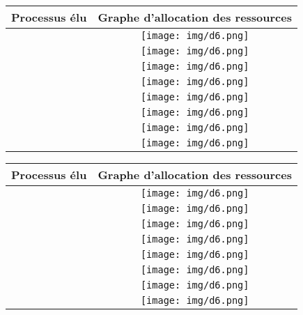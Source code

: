 \documentclass[a4paper,12pt,french]{book}
\newcommand{\truc}{4.5cm}
\begin{document}
\LARGE
\begin{center}
\begin{tabular}{|c|c|}
\hline
\rowcolor{UGLiOrange}\textbf{\color{white}Processus élu} & \textbf{\color{white}Graphe d'allocation des ressources} \\
\hline
 & \texttt{[image: img/d6.png]} \\
\hline
 & \texttt{[image: img/d6.png]} \\
\hline
 & \texttt{[image: img/d6.png]} \\
\hline
 & \texttt{[image: img/d6.png]} \\
\hline
 & \texttt{[image: img/d6.png]} \\
\hline
 & \texttt{[image: img/d6.png]} \\
\hline
 & \texttt{[image: img/d6.png]} \\
\hline
 & \texttt{[image: img/d6.png]} \\
\hline
 \end{tabular}
\end{center}
\newpage

\begin{center}
\begin{tabular}{|c|c|}
\hline
\rowcolor{UGLiOrange}\textbf{\color{white}Processus élu} & \textbf{\color{white}Graphe d'allocation des ressources} \\
\hline
 & \texttt{[image: img/d6.png]} \\
\hline
 & \texttt{[image: img/d6.png]} \\
\hline
 & \texttt{[image: img/d6.png]} \\
\hline
 & \texttt{[image: img/d6.png]} \\
\hline
 & \texttt{[image: img/d6.png]} \\
\hline
 & \texttt{[image: img/d6.png]} \\
\hline
 & \texttt{[image: img/d6.png]} \\
\hline
 & \texttt{[image: img/d6.png]} \\
\hline
 \end{tabular}
\end{center}
\newpage
\end{document}
